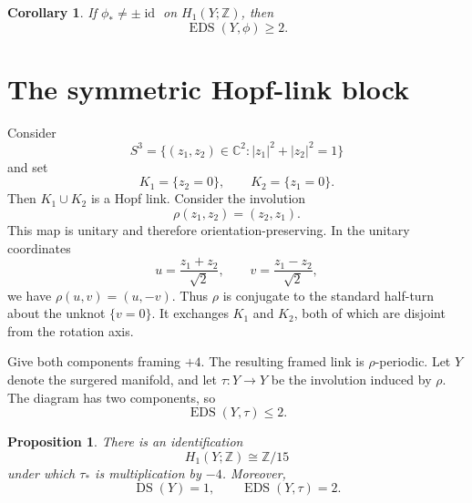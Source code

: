 \documentclass[11pt]{amsart}
\newcommand{\DS}{\operatorname{DS}}
\newcommand{\EDS}{\operatorname{EDS}}
\newcommand{\id}{\operatorname{id}}
\newcommand{\Z}{\mathbb{Z}}
\newcommand{\C}{\mathbb{C}}
\newtheorem{proposition}[theorem]{Proposition}
\newtheorem{corollary}[theorem]{Corollary}
\theoremstyle{definition}
\theoremstyle{remark}
\begin{document}
\begin{corollary}\label{cor:two-components}
If $\phi_*\neq\pm\id$ on $H_1(Y;\Z)$, then
\[
   \EDS(Y,\phi)\geq 2.
\]
\end{corollary}

\section{The symmetric Hopf-link block}

Consider
\[
   S^3=\bigl\{(z_1,z_2)\in\C^2:|z_1|^2+|z_2|^2=1\bigr\}
\]
and set
\[
   K_1=\{z_2=0\},
   \qquad
   K_2=\{z_1=0\}.
\]
Then $K_1\cup K_2$ is a Hopf link. Consider the involution
\[
   \rho(z_1,z_2)=(z_2,z_1).
\]
This map is unitary and therefore orientation-preserving. In the unitary coordinates
\[
   u=\frac{z_1+z_2}{\sqrt2},
   \qquad
   v=\frac{z_1-z_2}{\sqrt2},
\]
we have $\rho(u,v)=(u,-v)$. Thus $\rho$ is conjugate to the standard half-turn about the unknot $\{v=0\}$. It exchanges $K_1$ and $K_2$, both of which are disjoint from the rotation axis.

Give both components framing $+4$. The resulting framed link is $\rho$-periodic. Let $Y$ denote the surgered manifold, and let $\tau\colon Y\to Y$ be the involution induced by $\rho$. The diagram has two components, so
\[
   \EDS(Y,\tau)\leq 2.
\]

\begin{proposition}\label{prop:block}
There is an identification
\[
   H_1(Y;\Z)\cong\Z/15
\]
under which $\tau_*$ is multiplication by $-4$. Moreover,
\[
   \DS(Y)=1,
   \qquad
   \EDS(Y,\tau)=2.
\]
\end{proposition}
\end{document}
